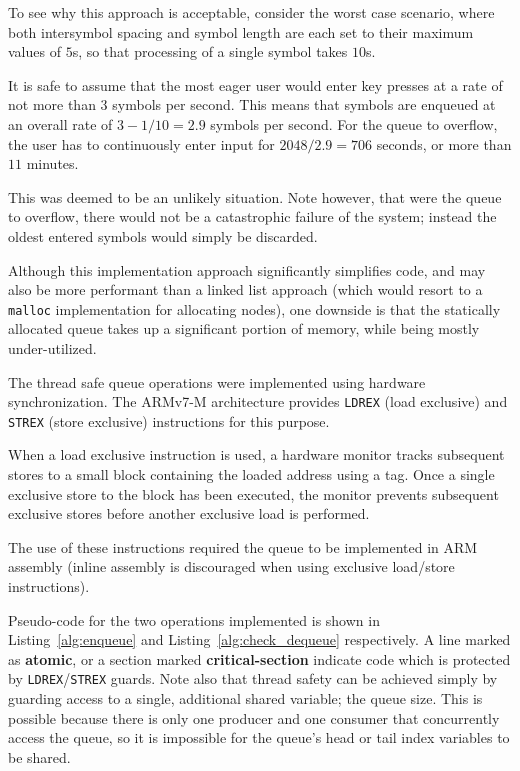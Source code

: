 \documentclass[11pt,a4paper,twocolumn]{scrartcl}
\begin{document}
To see why this approach is acceptable, consider the worst case scenario, where both intersymbol spacing and symbol length are each set to their maximum values of $5$s, so that processing of a single symbol takes $10$s. 

It is safe to assume that the most eager user would enter key presses at a rate of not more than $3$ symbols per second. This means that symbols are enqueued at an overall rate of $3 - 1/10 = 2.9$ symbols per second. For the queue to overflow, the user has to continuously enter input for $2048/2.9 = 706$ seconds, or more than $11$ minutes.

This was deemed to be an unlikely situation. Note however, that were the queue to overflow, there would not be a catastrophic failure of the system; instead the oldest entered symbols would simply be discarded.

Although this implementation approach significantly simplifies code, and may also be more performant than a linked list approach (which would resort to a \verb!malloc! implementation for allocating nodes), one downside is that the statically allocated queue takes up a significant portion of memory, while being mostly under-utilized.

The thread safe queue operations were implemented using hardware synchronization. The ARMv7-M architecture provides \verb!LDREX! (load exclusive) and \verb!STREX! (store exclusive) instructions for this purpose.

When a load exclusive instruction is used, a hardware monitor tracks subsequent stores to a small block containing the loaded address using a tag. Once a single exclusive store to the block has been executed, the monitor prevents subsequent exclusive stores before another exclusive load is performed.\cite{armv7_m_architecture_manual}

The use of these instructions required the queue to be implemented in ARM assembly (inline assembly is discouraged when using exclusive load/store instructions\cite{compiler_migration_guide}).

Pseudo-code for the two operations implemented is shown in Listing~\ref{alg:enqueue} and Listing~\ref{alg:check_dequeue} respectively. A line marked as \textbf{atomic}, or a section marked \textbf{critical-section} indicate code which is protected by \verb!LDREX!/\verb!STREX! guards. Note also that thread safety can be achieved simply by guarding access to a single, additional shared variable; the queue size. This is possible because there is only one producer and one consumer that concurrently access the queue, so it is impossible for the queue's head or tail index variables to be shared.
\end{document}
